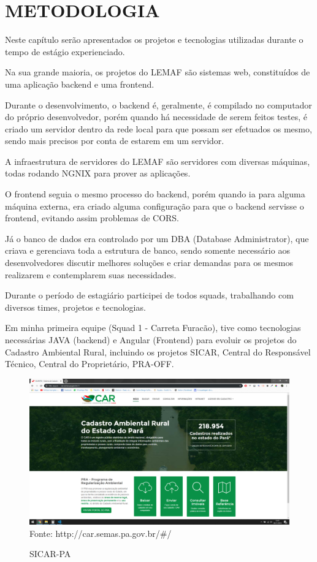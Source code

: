 \chapter{METODOLOGIA}
\label{cap:desenvolvimento}

Neste capítulo serão apresentados os projetos e tecnologias utilizadas durante o tempo de estágio experienciado.

Na sua grande maioria, os projetos do LEMAF são sistemas web, constituídos de uma aplicação backend e uma frontend.

Durante o desenvolvimento, o backend é, geralmente, é compilado no computador do próprio desenvolvedor, porém quando há necessidade de serem feitos testes, é criado um servidor dentro da rede local para que possam ser efetuados os mesmo, sendo mais precisos por conta de estarem em um servidor.

A infraestrutura de servidores do LEMAF são servidores com diversas máquinas, todas rodando NGNIX para prover as aplicações.

O frontend seguia o mesmo processo do backend, porém quando ia para alguma máquina externa, era criado alguma configuração para que o backend servisse o frontend, evitando assim problemas de CORS.

Já o banco de dados era controlado por um DBA (Database Administrator), que criava e gerenciava toda a estrutura de banco, sendo somente necessário aos desenvolvedores discutir melhores soluções e criar demandas para os mesmos realizarem e contemplarem suas necessidades.

Durante o período de estagiário participei de todos squads, trabalhando com diversos times, projetos e tecnologias.

Em minha primeira equipe (Squad 1 - Carreta Furacão), tive como tecnologias necessárias JAVA (backend) e Angular (Frontend) para evoluir os projetos do Cadastro Ambiental Rural, incluindo os projetos SICAR, Central do Responsável Técnico, Central do Proprietário, PRA-OFF.

\begin{figure}[H]
\centering
\caption{SICAR-PA} %
\includegraphics[scale=0.3]{SICAR}\\  %
{\small Fonte: http://car.semas.pa.gov.br/#/} %
\label{fig:exemplo} %
\end{figure}

